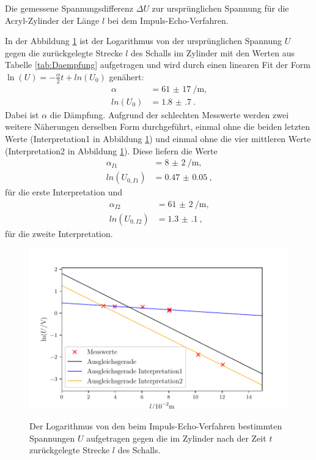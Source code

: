 \begin{table}
	\centering
	\caption{Die gemessene Spannungsdifferenz $\Delta U$ zur ursprünglichen Spannung für die Acryl-Zylinder der Länge $l$ bei dem Impuls-Echo-Verfahren.}
	
	\label{tab:Daempfung}
\end{table}

\noindent In der Abbildung \ref{fig:Daempfung} ist der Logarithmus von der ursprünglichen Spannung $U$ gegen die zurückgelegte Strecke $l$ des Schalls im Zylinder mit den Werten aus Tabelle \ref{tab:Daempfung} aufgetragen und wird durch einen linearen Fit der Form $\ln(U)=-\frac{\alpha}{2} t + ln(U_0)$ genähert:
\begin{align*}
	\alpha	&= \SI{61(17)}{\per\meter}\text{,}\\
	ln(U_0)	&=\SI{1.8(7)}{}\text{.}
\end{align*}
Dabei ist $\alpha$ die Dämpfung.
Aufgrund der schlechten Messwerte werden zwei weitere Näherungen derselben Form durchgeführt, einmal ohne die beiden letzten Werte (Interpretation1 in Abbildung \ref{fig:Daempfung}) und einmal ohne die vier mittleren Werte (Interpretation2 in Abbildung \ref{fig:Daempfung}). Diese liefern die Werte
\begin{align*}
	\alpha_{I1} &= \SI{8(2)}{\per\meter}\text{,}\\
	ln(U_{0,I1})&=\SI{0.47(5)}{}\text{,}
\end{align*} 
für die erste Interpretation und
\begin{align*}
	\alpha_{I2} &= \SI{61(2)}{\per\meter}\text{,}\\
	ln(U_{0,I2})&=\SI{1.3(1)}{}\text{,}
\end{align*}
für die zweite Interpretation.

\begin{figure}
	\centering
	\caption{Der Logarithmus von den beim Impuls-Echo-Verfahren bestimmten Spannungen $U$ aufgetragen gegen die im Zylinder nach der Zeit $t$ zurückgelegte Strecke $l$ des Schalls.}
	\includegraphics[width=\linewidth-70pt,height=\textheight-70pt,keepaspectratio]{content/images/Daempfung.pdf}
	\label{fig:Daempfung}
\end{figure}

